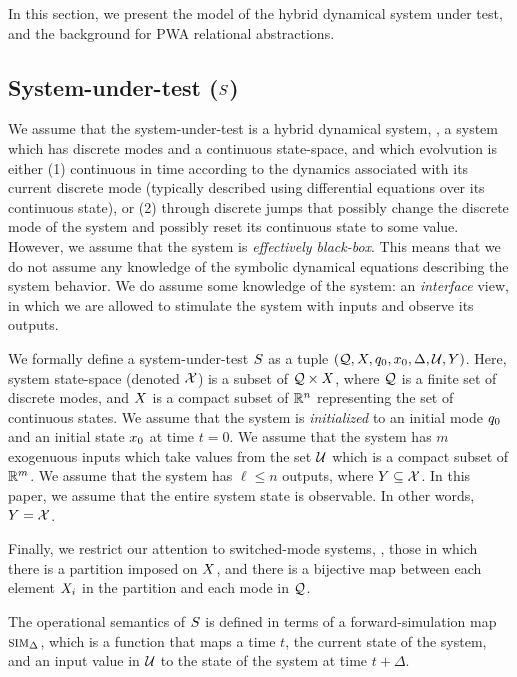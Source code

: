 In this section, we present the model of the hybrid dynamical system
under test, and the background for PWA relational abstractions.


\subsection{System-under-test ($S$)}

We assume that the system-under-test is a hybrid dynamical system, \ie, a
system which has discrete modes and a continuous state-space, and which
evolvution is either (1) continuous in time according to the dynamics
associated with its current discrete mode (typically described using
differential equations over its continuous state), or (2) through
discrete jumps that possibly change the discrete mode of the system and
possibly reset its continuous state to some value.  However, we assume
that the system is {\em effectively black-box}. This means that we do not
assume any knowledge of the symbolic dynamical equations describing the
system behavior. We do assume some knowledge of the system: an {\em
interface} view, in which we are allowed to stimulate the system with
inputs and observe its outputs. 

We formally define a system-under-test $S$ as a tuple $(\mathcal{Q},
X, q_{0}, x_0, \Delta, \mathcal{U}, Y)$.  Here,
system state-space (denoted $\mathcal{X}$) is a subset of $\mathcal{Q} \times
X$, where $\mathcal{Q}$ is a finite set of discrete modes, and
$X$ is a compact subset of $\mathbb{R}^n$ representing the set of
continuous states.  We assume that the system is {\em initialized} to an
initial mode $q_{0}$ and an initial state $x_0$ at time $t=0$.
We assume that the system has $m$ exogenuous inputs which take values from
the set $\mathcal{U}$ which is a compact subset of $\mathbb{R}^m$. We assume that
the system has $\ell \le n$ outputs, where $Y \subseteq
\mathcal{X}$. In this paper, we assume that the entire system state is
observable.  In other words, $Y = \mathcal{X}$. 

Finally, we restrict our attention to switched-mode systems, \ie, those in
which there is a partition imposed on $X$, and there is a
bijective map between each element $X_i$ in the partition and
each mode in $\mathcal{Q}$.

The operational semantics of $S$ is defined in terms of a
forward-simulation map $\mbox{\sc sim}_\Delta$, which is a function that maps a
time $t$, the current state of the system, and an input value in $\mathcal{U}$
to the state of the system at time $t+\Delta$.




